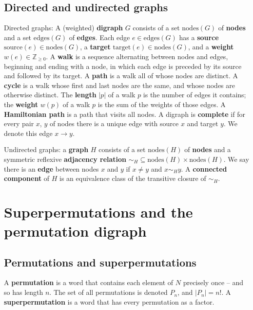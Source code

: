 \documentclass[a4paper]{article}
\theoremstyle{definition}
\theoremstyle{remark}
\let\definiendum\textbf
\begin{document}
\subsection{Directed and undirected graphs}
\def\nodes{\mathrm{nodes}}
\def\edges{\mathrm{edges}}
\def\source{\mathrm{source}}
\def\target{\mathrm{target}}
Directed graphs: A (weighted) \definiendum{digraph} $G$ consists of a set $\nodes(G)$ of \definiendum{nodes} and a set $\edges(G)$ of \definiendum{edges}. Each edge $e\in\edges(G)$ has a \definiendum{source} $\source(e)\in\nodes(G)$, a \definiendum{target} $\target(e)\in\nodes(G)$, and a \definiendum{weight} $w(e)\in\mathbb{Z}_{\ge 0}$.
%
A \definiendum{walk} is a sequence alternating between nodes and edges, beginning and ending with a node, in which each edge is preceded by its source and followed by its target.
%
A \definiendum{path} is a walk all of whose nodes are distinct.
%
A \definiendum{cycle} is a walk whose first and last nodes are the same, and whose nodes are otherwise distinct.
%
The \definiendum{length} $|p|$ of a walk $p$ is the number of edges it contains; the \definiendum{weight} $w(p)$ of a walk $p$ is the sum of the weights of those edges.
%
A \definiendum{Hamiltonian path} is a path that visits all nodes.
%
A digraph is \definiendum{complete} if for every pair $x$, $y$ of nodes there is a unique edge with source $x$ and target $y$. We denote this edge $x\to y$.

Undirected graphs: a \definiendum{graph} $H$ consists of a set $\nodes(H)$ of \definiendum{nodes} and a symmetric reflexive \definiendum{adjacency relation} $\mathord{\sim_H} \subseteq \nodes(H)\times\nodes(H)$.
%
We say there is an \definiendum{edge} between nodes $x$ and $y$ if $x\neq y$ and $x\sim_Hy$.
%
A \definiendum{connected component} of $H$ is an equivalence class of the transitive closure of $\sim_H$.

\section{Superpermutations and the permutation digraph}
%
\subsection{Permutations and superpermutations}\label{s:permutations-and-superpermutations}
A \definiendum{permutation} is a word that contains each element of $N$ precisely once -- and so has length $n$. The set of all permutations is denoted $P_n$, and $|P_n|=n!$. A \definiendum{superpermutation} is a word that has every permutation as a factor.
\end{document}
